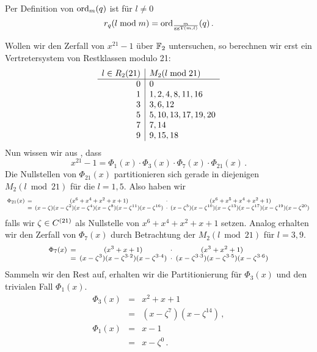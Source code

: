 \begin{bemerkung}
  Per Definition von $\operatorname{ord}_m(q)$ ist für $l\neq 0$
  \[ r_q(l\bmod m) = \operatorname{ord}_{\frac{m}{\operatorname{ggT}(m,l)}}(q)\,. \]
\end{bemerkung}


\begin{beispiel}
  \label{beispiel:zerfall_x21_1_1}
  Wollen wir den Zerfall von $x^{21}-1$ über $\mathbb{F}_2$ untersuchen, so berechnen
  wir erst ein Vertretersystem von Restklassen modulo 21:
  \[\begin{array}[t]{r|l}
    l \in R_2(21) & M_2(l \bmod{21}) \\\hline
    0 & 0 \\
    1 & 1, 2, 4, 8, 11, 16 \\
    3 & 3, 6, 12 \\
    5 & 5, 10, 13, 17, 19, 20 \\
    7 & 7, 14 \\
    9 & 9, 15, 18
  \end{array}\]
  Nun wissen wir aus , dass 
  \[ x^{21} -1 = \Phi_1(x) \cdot \Phi_3(x) \cdot \Phi_7(x) \cdot
  \Phi_{21}(x)\,.\]
  Die Nullstellen von $\Phi_{21}(x)$ partitionieren sich gerade in
  diejenigen $M_2(l\bmod{21})$ für die $l=1,5$.
  Also haben wir 
  \[\footnotesize\setlength{\arraycolsep}{2pt}\everymath{\displaystyle}
    \begin{array}{rcccc} 
      \Phi_{21}(x) &=& (x^{6} + x^{4} + x^{2} + x + 1) 
        &\cdot& (x^{6} + x^{5} + x^{4} + x^{2} + 1) \\
      &=& (x-\zeta)(x-\zeta^2)(x-\zeta^4)(x-\zeta^8)(x-\zeta^{11})
        (x-\zeta^{16}) &\cdot&
        (x-\zeta^5)(x-\zeta^{10})(x-\zeta^{13})(x-\zeta^{17})
        (x-\zeta^{19})(x-\zeta^{20})\,
    \end{array}\]
  falls wir $\zeta \in C^{(21)}$ als Nullstelle von
  $x^6+x^4+x^2+x+1$ setzen.
  Analog erhalten wir den Zerfall von $\Phi_7(x)$ durch Betrachtung der
  $M_2(l\bmod{21})$ für $l=3,9$. 
  \[\footnotesize\setlength{\arraycolsep}{2pt}\everymath{\displaystyle}
    \begin{array}{rcccc} 
      \Phi_7(x)&=& (x^{3} + x + 1) &\cdot& (x^{3} + x^{2} + 1) \\
      &=& (x-\zeta^3)(x-\zeta^{3\cdot 2})(x-\zeta^{3\cdot 4}) &\cdot&
        (x-\zeta^{3\cdot 3})(x-\zeta^{3\cdot 5})(x-\zeta^{3\cdot 6}) 
    \end{array}\]
  Sammeln wir den Rest auf, erhalten wir die Partitionierung für
  $\Phi_3(x)$ und den trivialen Fall $\Phi_1(x)$.
  \[ \begin{array}{rcc} 
    \Phi_3(x) &=& x^2 + x + 1\\
              &=& (x-\zeta^7)(x-\zeta^{14})\,,\\[10pt]
    \Phi_1(x) &=& x-1\\
             &=& x-\zeta^0\,.
    \end{array}\]
\end{beispiel}


